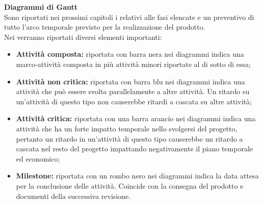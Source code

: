 \documentclass{scalatekids-article}
\begin{document}
\textbf{Diagrammi di Gantt}\\
Sono riportati nei prossimi capitoli i  relativi alle fasi elencate e un  preventivo di tutto l'arco temporale previsto per la realizzazione del prodotto.\\
Nei  verranno riportati diversi elementi importanti:
\begin{itemize}
	\item \textbf{Attività composta:} riportata con barra nera nei diagrammi indica una marco-attività composta in più attività minori riportate al di sotto di essa;
	\item \textbf{Attività non critica:} riportata con barra blu nei diagrammi indica una attività che può essere svolta parallelamente a altre attività. Un ritardo su un'attività di questo tipo non causerebbe ritardi a cascata su altre attività;
	\item \textbf{Attività critica:} riportata con una barra arancio nei diagrammi indica una attività che ha un forte impatto temporale nello svolgersi del progetto, pertanto un ritardo in un'attività di questo tipo causerebbe un ritardo a cascata nel resto del progetto impattando negativamente il piano temporale ed economico;
	\item \textbf{Milestone:} riportata con un rombo nero nei diagrammi indica la data attesa per la conclusione delle attività. Coincide con la consegna del prodotto e documenti della successiva revisione.
\end{itemize} 
\end{document}

